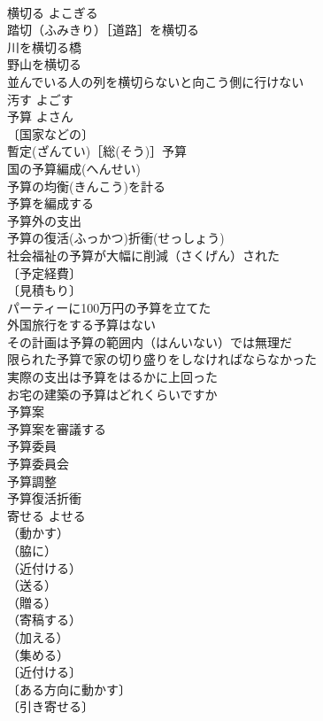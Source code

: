 \documentclass[8pt]{extreport}
\begin{document}
\begin{CJK}{UTF8}{min}
\\	横切る	よこぎる	
\\	踏切（ふみきり）［道路］を横切る 
\\	川を横切る橋 
\\	野山を横切る 
\\	並んでいる人の列を横切らないと向こう側に行けない 
\\	汚す	よごす	
\\	予算	よさん	
\\	〔国家などの〕
\\	暫定(ざんてい)［総(そう)］予算 
\\	国の予算編成(へんせい) 
\\	予算の均衡(きんこう)を計る 
\\	予算を編成する 
\\	予算外の支出 
\\	予算の復活(ふっかつ)折衝(せっしょう) 
\\	社会福祉の予算が大幅に削減（さくげん）された 
\\	〔予定経費〕
\\	〔見積もり〕
\\	パーティーに100万円の予算を立てた 
\\	外国旅行をする予算はない 
\\	その計画は予算の範囲内（はんいない）では無理だ 
\\	限られた予算で家の切り盛りをしなければならなかった 
\\	実際の支出は予算をはるかに上回った 
\\	お宅の建築の予算はどれくらいですか 
\\	予算案 
\\	予算案を審議する 
\\	予算委員 
\\	予算委員会 
\\	予算調整 
\\	予算復活折衝 
\\	寄せる	よせる	
\\	（動かす）
\\	（脇に）
\\	（近付ける）
\\	（送る）
\\	（贈る）
\\	（寄稿する）
\\	（加える）
\\	（集める）
\\	〔近付ける〕
\\	〔ある方向に動かす〕
\\	〔引き寄せる〕

\end{CJK}
\end{document}

